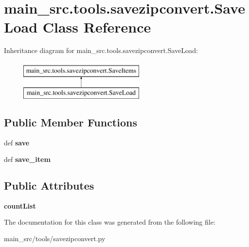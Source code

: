 \hypertarget{classmain__src_1_1tools_1_1savezipconvert_1_1SaveLoad}{\section{main\-\_\-src.\-tools.\-savezipconvert.\-Save\-Load Class Reference}
\label{classmain__src_1_1tools_1_1savezipconvert_1_1SaveLoad}
}
Inheritance diagram for main\-\_\-src.\-tools.\-savezipconvert.\-Save\-Load\-:\begin{figure}[H]
\begin{center}
\leavevmode
\includegraphics[height=2.000000cm]{classmain__src_1_1tools_1_1savezipconvert_1_1SaveLoad}
\end{center}
\end{figure}
\subsection*{Public Member Functions}
\begin{DoxyCompactItemize}
\item 
\hypertarget{classmain__src_1_1tools_1_1savezipconvert_1_1SaveLoad_a051691c5802dd7a0fdcbd3cad22e239d}{def {\bfseries save}}\label{classmain__src_1_1tools_1_1savezipconvert_1_1SaveLoad_a051691c5802dd7a0fdcbd3cad22e239d}

\item 
\hypertarget{classmain__src_1_1tools_1_1savezipconvert_1_1SaveLoad_a96bdd42ddea89364cc56401ee6a468e3}{def {\bfseries save\-\_\-item}}\label{classmain__src_1_1tools_1_1savezipconvert_1_1SaveLoad_a96bdd42ddea89364cc56401ee6a468e3}

\end{DoxyCompactItemize}
\subsection*{Public Attributes}
\begin{DoxyCompactItemize}
\item 
\hypertarget{classmain__src_1_1tools_1_1savezipconvert_1_1SaveLoad_a23f9da0113f2e29fe2bd7597cd2207a5}{{\bfseries count\-List}}\label{classmain__src_1_1tools_1_1savezipconvert_1_1SaveLoad_a23f9da0113f2e29fe2bd7597cd2207a5}

\end{DoxyCompactItemize}


The documentation for this class was generated from the following file\-:\begin{DoxyCompactItemize}
\item 
main\-\_\-src/tools/savezipconvert.\-py\end{DoxyCompactItemize}
